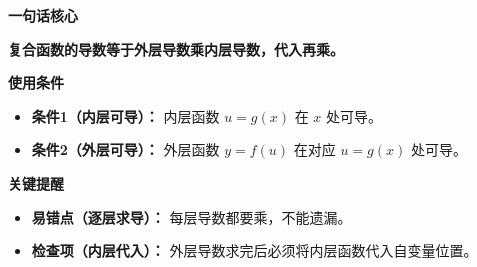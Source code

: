 \begin{summarybox}
	\textbf{\textcolor{CSummary}{一句话核心}}

	\textbf{复合函数的导数等于外层导数乘内层导数，代入再乘。}

	\medskip
	\textbf{\textcolor{CSummary}{使用条件}}
	\begin{itemize}[leftmargin=*, itemsep=0.5em, topsep=0.4em]
		\item \textbf{条件1（内层可导）：} 内层函数 $u=g(x)$ 在 $x$ 处可导。
		\item \textbf{条件2（外层可导）：} 外层函数 $y=f(u)$ 在对应 $u=g(x)$ 处可导。
	\end{itemize}

	\medskip
	\textbf{\textcolor{CSummary}{关键提醒}}
	\begin{itemize}[leftmargin=*, itemsep=0.5em, topsep=0.4em]
		\item \textbf{易错点（逐层求导）：} 每层导数都要乘，不能遗漏。
		\item \textbf{检查项（内层代入）：} 外层导数求完后必须将内层函数代入自变量位置。
	\end{itemize}
\end{summarybox}
